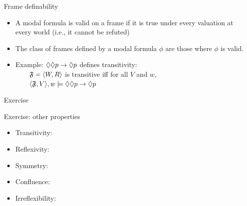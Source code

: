\documentclass{beamer}
\begin{document}
\begin{slide}{Frame definability}\label{s:32}
\small
\begin{itemize}
  \item A modal formula is valid on a frame if it is true under every valuation at every world (i.e., it cannot be refuted)
  \item The class of frames defined by a modal formula $\phi$ are those where $\phi$ is valid.
  \item Example: $\Diamond\Diamond p \to \Diamond p$ defines transitivity:\\
  ~~~~$\mathfrak{F}=\mathopen{\langle}W,R\mathclose{\rangle}$ is transitive iff for all $V$ and $w$,\\
  ~~~~$\mathopen{\langle}\mathfrak{F},V\mathclose{\rangle},w\models \Diamond\Diamond p \to \Diamond p $
\end{itemize}
\end{slide}
\begin{slide}{Exercise}\label{s:32}
\small

\begin{exampleblock}{Exercise: other properties}
\begin{itemize}
  \item Transitivity: 
  \item Reflexivity: 
  \item Symmetry:    
  \item Confluence:  
  \item Irreflexibility:  
\end{itemize}
\end{exampleblock}

\end{slide}

\end{document}
